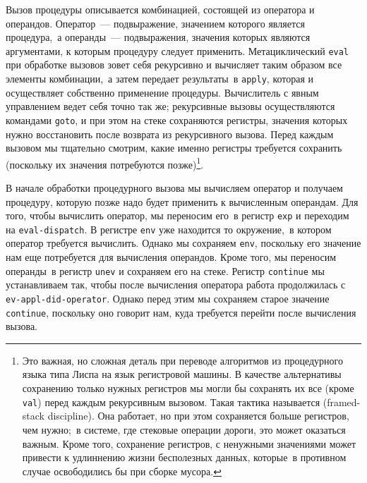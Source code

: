 Вызов процедуры описывается комбинацией, состоящей из
оператора и операндов.  Оператор~--- подвыражение, значением которого
является процедура,~а операнды~--- подвыражения, значения которых
являются аргументами, к которым процедуру следует применить.
Метациклический {\tt eval} при обработке вызовов зовет себя
рекурсивно и вычисляет таким образом все элементы комбинации,~а затем
передает результаты~в {\tt apply}, которая и осуществляет
собственно применение процедуры.  Вычислитель с явным управлением  
ведет себя точно так же; рекурсивные вызовы осуществляются командами
{\tt goto}, и при этом на стеке сохраняются регистры, значения
которых нужно восстановить после возврата из рекурсивного вызова.
Перед каждым вызовом мы тщательно смотрим, какие именно регистры
требуется сохранить (поскольку их значения потребуются
позже)\footnote{Это важная, но сложная деталь при переводе алгоритмов
из процедурного языка типа Лиспа на язык регистровой машины.  В
качестве альтернативы сохранению только нужных регистров мы могли бы
сохранять их все (кроме {\tt val}) перед каждым рекурсивным
вызовом.  Такая тактика называется 
 (framed-stack discipline).  Она работает, но при этом сохраняется
больше регистров, чем нужно;~в системе, где стековые операции дороги,
это может оказаться важным.  Кроме того, сохранение регистров,
с ненужными значениями может привести к удлиннению жизни
бесполезных данных, которые~в противном случае освободились бы
при сборке мусора.
}.

В начале обработки процедурного вызова мы вычисляем
оператор и получаем процедуру, которую позже надо будет применить к
вычисленным операндам.  Для того, чтобы вычислить оператор, мы
переносим его~в регистр {\tt exp} и переходим на
{\tt eval-dispatch}.  В регистре {\tt env} уже
находится то окружение,~в котором оператор требуется вычислить.
Однако мы сохраняем {\tt env}, поскольку его значение нам еще
потребуется для вычисления операндов.  Кроме того, мы переносим
операнды~в регистр {\tt unev} и сохраняем его на стеке.
Регистр {\tt continue} мы устанавливаем так, чтобы после
вычисления оператора работа продолжилась с
{\tt ev-appl-did-operator}.  Однако перед этим мы сохраняем
старое значение {\tt continue}, поскольку оно говорит нам, куда
требуется перейти после вычисления вызова.

